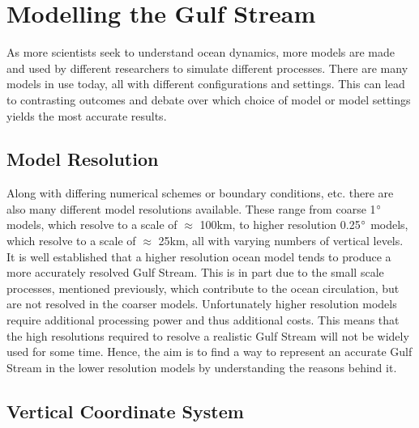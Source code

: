 \documentclass[..\EOYR.tex]{subfiles}
\begin{document}
\section{Modelling the Gulf Stream} \label{ModellingGulfStream}

As more scientists seek to understand ocean dynamics, more models are made and used by different researchers to simulate different processes. There are many models in use today, all with different configurations and settings. This can lead to contrasting outcomes and debate over which choice of model or model settings yields the most accurate results.

\subsection{Model Resolution}

	Along with differing numerical schemes or boundary conditions, etc. there are also many different model resolutions available. These range from coarse 1$\degree$ models, which resolve to a scale of $\approx$ 100km, to higher resolution 0.25$\degree$ models, which resolve to a scale of $\approx$ 25km, all with varying numbers of vertical levels. It is well established \citep{Scaife2011a}\citep{Hurlburt2008} that a higher resolution ocean model tends to produce a more accurately resolved Gulf Stream. This is in part due to the small scale processes, mentioned previously, which contribute to the ocean circulation, but are not resolved in the coarser models. Unfortunately higher resolution models require additional processing power and thus additional costs. This means that the high resolutions required to resolve a realistic Gulf Stream will not be widely used for some time. Hence, the aim is to find a way to represent an accurate Gulf Stream in the lower resolution models by understanding the reasons behind it.

\subsection{Vertical Coordinate System}
\end{document}
